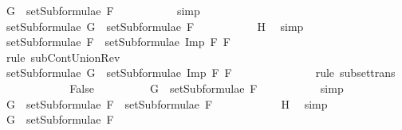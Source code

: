 \begin{isabellebody}
\ {\isachardoublequoteopen}G\ {\isasymin}\ setSubformulae\ F{}{\isachardoublequoteclose}\ \isanewline
\ \ \ \ \ \ \ \ \isamarkupfalse%
\ simp\ %
\isanewline
\ \ \ \ \ \ \isamarkupfalse%
\ \isamarkupfalse%
\ {}{\isacharcolon}{\isachardoublequoteopen}setSubformulae\ G\ {\isasymsubseteq}\ setSubformulae\ F{}{\isachardoublequoteclose}\ \isanewline
\ \ \ \ \ \ \ \ \isamarkupfalse%
\ H{}\ \isamarkupfalse%
\ simp\ %
\isanewline
\ \ \ \ \ \ \isamarkupfalse%
\ {}{\isacharcolon}{\isachardoublequoteopen}setSubformulae\ F{}\ {\isasymsubseteq}\ setSubformulae\ {\isacharparenleft}Imp\ F{}\ F{}{\isacharparenright}{\isachardoublequoteclose}\ \isanewline
\ \ \ \ \ \ \ \ \isamarkupfalse%
\ {}\ \isamarkupfalse%
\ {\isacharparenleft}rule\ subContUnionRev{}{\isacharparenright}\ \ \isanewline
\ \ \ \ \ \ \isamarkupfalse%
\ {\isachardoublequoteopen}setSubformulae\ G\ {\isasymsubseteq}\ setSubformulae\ {\isacharparenleft}Imp\ F{}\ F{}{\isacharparenright}{\isachardoublequoteclose}\ \isanewline
\ \ \ \ \ \ \ \ \isamarkupfalse%
\ {}\ {}\ \isamarkupfalse%
\ {\isacharparenleft}rule\ subset{\isacharunderscore}trans{\isacharparenright}\isanewline
\ \ \ \ \isamarkupfalse%
\isanewline
\ \ \ \ \ \ \isamarkupfalse%
\ False\isanewline
\ \ \ \ \ \ \isamarkupfalse%
\ \isamarkupfalse%
\ {}{\isacharcolon}{\isachardoublequoteopen}G\ {\isasymnotin}\ setSubformulae\ F{}{\isachardoublequoteclose}\ \isanewline
\ \ \ \ \ \ \ \ \isamarkupfalse%
\ simp\ %
\isanewline
\ \ \ \ \ \ \isamarkupfalse%
\ {\isachardoublequoteopen}G\ {\isasymin}\ setSubformulae\ F{}\ {\isasymunion}\ setSubformulae\ F{}{\isachardoublequoteclose}\ \isanewline
\ \ \ \ \ \ \ \ \isamarkupfalse%
\ {}\ H{}\ \isamarkupfalse%
\ simp\ %
\isanewline
\ \ \ \ \ \ \isamarkupfalse%
\ \isamarkupfalse%
\ {\isachardoublequoteopen}G\ {\isasymin}\ setSubformulae\ F{}{\isachardoublequoteclose}\ \isanewline
\ \ \ \ \ \ \ \ \isamarkupfalse%

\end{isabellebody}
